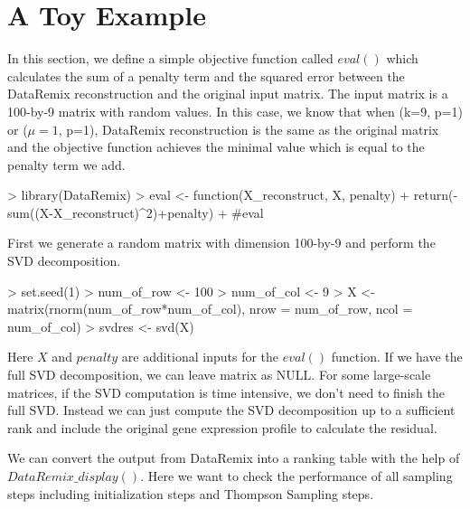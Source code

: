 \documentclass{article}
\begin{document}
\section{A Toy Example}
In this section, we define a simple objective function called $eval()$ which calculates the sum of a penalty term and the squared error between the DataRemix reconstruction and the original input matrix. The input matrix is a 100-by-9 matrix with random values. In this case, we know that when (k=9, p=1) or ($\mu=1$, p=1), DataRemix reconstruction is the same as the original matrix and the objective function achieves the minimal value which is equal to the penalty term we add. 
\begin{Schunk}
\begin{Sinput}
> library(DataRemix)
> eval <- function(X_reconstruct, X, penalty){
+   return(-sum((X-X_reconstruct)^2)+penalty)
+ }#eval
\end{Sinput}
\end{Schunk}
First we generate a random matrix with dimension 100-by-9 and perform the SVD decomposition.
\begin{Schunk}
\begin{Sinput}
> set.seed(1)
> num_of_row <- 100
> num_of_col <- 9
> X <- matrix(rnorm(num_of_row*num_of_col), nrow = num_of_row, ncol = num_of_col)
> svdres <- svd(X)
\end{Sinput}
\end{Schunk}
Here $X$ and $penalty$ are additional inputs for the $eval()$ function. If we have the full SVD decomposition, we can leave matrix as NULL. For some large-scale matrices, if the SVD computation is time intensive, we don't need to finish the full SVD. Instead we can just compute the SVD decomposition up to a sufficient rank and include the original gene expression profile to calculate the residual. 
\begin{Schunk}
\end{Schunk}
We can convert the output from DataRemix into a ranking table with the help of $DataRemix\_display()$. Here we want to check the performance of all sampling steps including initialization steps and Thompson Sampling steps.
\end{document}
